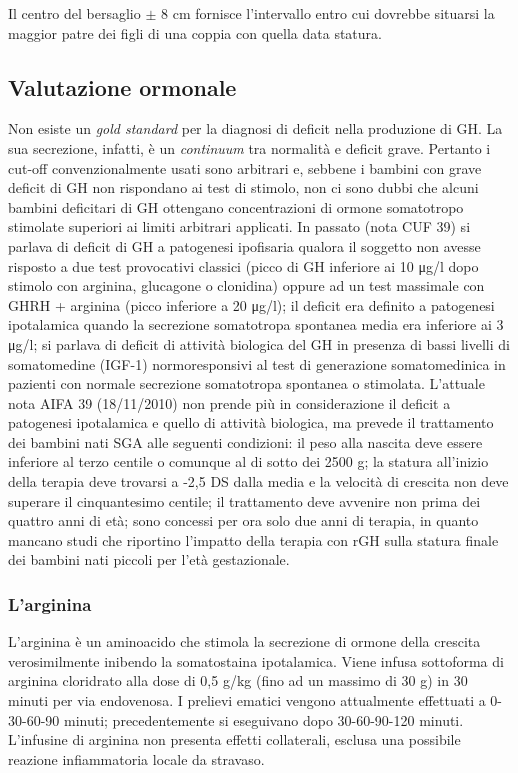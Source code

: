 Il centro del bersaglio $\pm$ 8 cm fornisce l'intervallo entro cui dovrebbe situarsi la maggior patre dei figli di una coppia con quella data statura.





\clearpage

\subsection{Valutazione ormonale}

Non esiste un \emph{gold standard} per la diagnosi di deficit nella produzione di GH\cite{gh2003update}. La sua secrezione, infatti, è un \emph{continuum} tra normalità e deficit grave. Pertanto i cut-off convenzionalmente usati sono arbitrari e, sebbene i bambini con grave deficit di GH non rispondano ai test di stimolo, non ci sono dubbi che alcuni bambini deficitari di GH ottengano concentrazioni di ormone somatotropo stimolate superiori ai limiti arbitrari applicati.
In passato (nota CUF 39) si parlava di deficit di GH a patogenesi ipofisaria qualora il soggetto non avesse risposto a due test provocativi classici (picco di GH inferiore ai 10 \unit{\micro g}/l dopo stimolo con arginina, glucagone o clonidina) oppure ad un test massimale con GHRH + arginina (picco inferiore a 20 \unit{\micro g}/l); il deficit era definito a patogenesi ipotalamica quando la secrezione somatotropa spontanea media era inferiore ai 3 \unit{\micro g}/l; si parlava di deficit di attività biologica del GH in presenza di bassi livelli di somatomedine (IGF-1) normoresponsivi al test di generazione somatomedinica in pazienti con normale secrezione somatotropa spontanea o stimolata.
L'attuale nota AIFA 39 (18/11/2010) non prende più in considerazione il deficit a patogenesi ipotalamica e quello di attività biologica, ma prevede il trattamento dei bambini nati SGA alle seguenti condizioni: il peso alla nascita deve essere inferiore al terzo centile o comunque al di sotto dei 2500 g; la statura all'inizio della terapia deve trovarsi a -2,5 DS dalla media e la velocità di crescita non deve superare il cinquantesimo centile; il trattamento deve avvenire non prima dei quattro anni di età; sono concessi per ora solo due anni di terapia, in quanto mancano studi che riportino l'impatto della terapia con rGH sulla statura finale dei bambini nati piccoli per l'età gestazionale.

\subsubsection*{L'arginina}
L'arginina è un aminoacido che stimola la secrezione di ormone della crescita verosimilmente inibendo la somatostaina ipotalamica. Viene infusa sottoforma di arginina cloridrato alla dose di 0,5 g/kg (fino ad un massimo di 30 g) in 30 minuti per via endovenosa. I prelievi ematici vengono attualmente effettuati a 0-30-60-90 minuti; precedentemente si eseguivano dopo 30-60-90-120 minuti. L'infusine di arginina non presenta effetti collaterali, esclusa una possibile reazione infiammatoria locale da stravaso.

